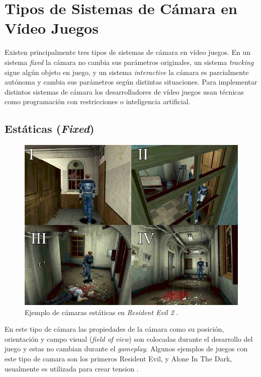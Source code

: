 \section{Tipos de Sistemas de Cámara en Vídeo Juegos}
Existen principalmente tres tipos de sistemas de cámara en vídeo juegos. En un sistema \emph{fixed} la cámara no cambia sus parámetros originales, un sistema \emph{tracking} sigue algún objeto en juego, y un sistema \emph{interactive} la cámara es parcialmente autónoma y cambia sus parámetros según distintas situaciones. Para implementar distintos sistemas de cámara los desarrolladores de vídeo juegos usan técnicas como programación con restricciones o inteligencia artificial. 
\subsection{Estáticas (\emph{Fixed})}
\begin{figure}
\includegraphics[width=\linewidth]{semana2/resident_evil_camerawork.jpg} 
\caption{Ejemplo de cámaras estáticas en \emph{Resident Evil 2} \cite{fixed_camera} \cite{residentevil2}.}
\end{figure}
En este tipo de cámara las propiedades de la cámara como su posición, orientación y campo visual (\emph{field of view}) son colocadas durante el desarrollo del juego y estas no cambian durante el \emph{gameplay}. Algunos ejemplos de juegos con este tipo de camara son los primeros Resident Evil, y Alone In The Dark, usualmente es utilizada para crear tension \cite{res5_review}\cite{fixed_camera}.
